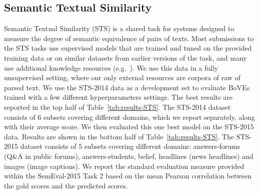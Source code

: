 \documentclass[11pt,a4paper]{article}
\newcommand{\bove}{Bo{\nolinebreak\hspace{-0.25ex}}VE}
\begin{document}
\subsection{Semantic Textual Similarity}

Semantic Textual Similarity (STS) \cite{agirre2014semeval,Agirre2015SemEval2015T2} is a shared task for systems designed to
measure the degree of semantic equivalence of pairs of texts. Most submissions
to the STS tasks use supervised models that are trained and tuned on the
provided training data or on similar datasets from earlier versions of the
task, and many use additional knowledge resources
(e.g.\ \cite{sultan2015dls}).  We use this data in a 
fully unsupervised setting, where our only external resources are corpora of
raw of parsed text.  We use the STS-2014 data as
a development set to evaluate {\bove}s trained with a few different
hyperparameters settings.  The best results are reported in the top half of
Table~\ref{tab:results-STS}.  The STS-2014 dataset consists of 6 subsets
covering different domains, which we report separately, along with their
average score.  We then evaluated this one best model on the STS-2015 data.
Results are shown in the bottom half of Table~\ref{tab:results-STS}.  The
STS-2015 dataset consists of 5 subsets covering different domains:
answers-forums (Q\&A in public forums), answers-students, belief, headlines
(news headlines) and images (image captions).  We report the standard
evaluation measure provided within the SemEval-2015 Task 2 \cite{Agirre2015SemEval2015T2}
based on the mean Pearson correlation between
the gold scores and the predicted scores.
\end{document}
